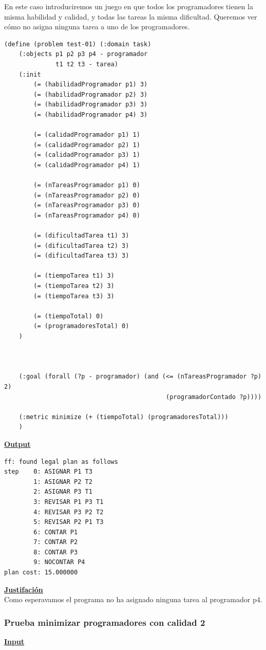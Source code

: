 \documentclass[11pt]{article}
\begin{document}
En este caso introduciremos un juego en que todos los programadores tienen la misma habilidad y calidad, y todas las tareas la misma dificultad. Queremos ver cómo no asigna ninguna tarea a uno de los programadores.
\begin{verbatim}
(define (problem test-01) (:domain task)
    (:objects p1 p2 p3 p4 - programador
			  t1 t2 t3 - tarea)
    (:init
        (= (habilidadProgramador p1) 3)
        (= (habilidadProgramador p2) 3)
        (= (habilidadProgramador p3) 3)
        (= (habilidadProgramador p4) 3)
        
        (= (calidadProgramador p1) 1)
        (= (calidadProgramador p2) 1)
        (= (calidadProgramador p3) 1)
        (= (calidadProgramador p4) 1)
        
        (= (nTareasProgramador p1) 0)
        (= (nTareasProgramador p2) 0)
        (= (nTareasProgramador p3) 0)
        (= (nTareasProgramador p4) 0)
        
        (= (dificultadTarea t1) 3)
        (= (dificultadTarea t2) 3)
        (= (dificultadTarea t3) 3)
        
        (= (tiempoTarea t1) 3)
        (= (tiempoTarea t2) 3)
        (= (tiempoTarea t3) 3)
        
        (= (tiempoTotal) 0)
        (= (programadoresTotal) 0)
    )

    

    (:goal (forall (?p - programador) (and (<= (nTareasProgramador ?p) 2)
											(programadorContado ?p))))
    
    (:metric minimize (+ (tiempoTotal) (programadoresTotal)))
    )
 \end{verbatim}
 \medskip
 
 \noindent \underline{\textbf{Output}}
\medskip
\begin{verbatim}
ff: found legal plan as follows
step    0: ASIGNAR P1 T3
        1: ASIGNAR P2 T2
        2: ASIGNAR P3 T1
        3: REVISAR P1 P3 T1
        4: REVISAR P3 P2 T2
        5: REVISAR P2 P1 T3
        6: CONTAR P1
        7: CONTAR P2
        8: CONTAR P3
        9: NOCONTAR P4
plan cost: 15.000000
\end{verbatim}
\medskip

\noindent \underline{\textbf{Justifación}}\\

Como esperavamos el programa no ha asignado ninguna tarea al programador p4.

\subsubsection{Prueba minimizar programadores con calidad 2}
\noindent \underline{\textbf{Input}} \\
\end{document}

